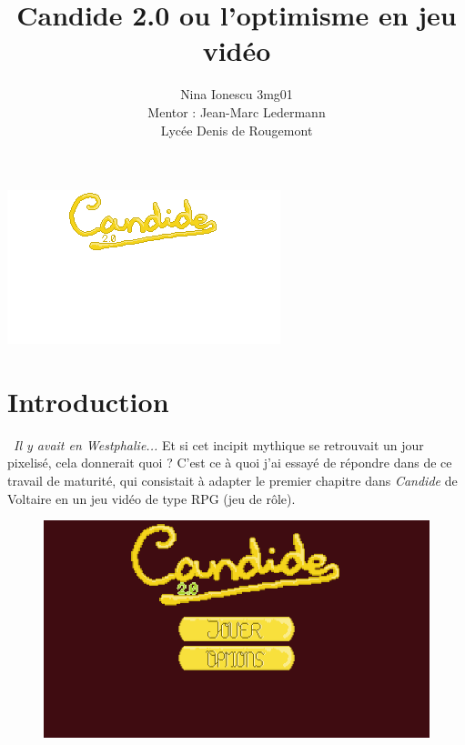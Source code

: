\documentclass[11pt]{article}
\begin{document}
\renewcommand{\appendixtocname}{Annexes}
\renewcommand{\appendixpagename}{Annexes}
\renewcommand{\refname}{Sources}



\title{Candide 2.0 ou l'optimisme en jeu vidéo }
\author{Nina Ionescu 3mg01 \\ Mentor : Jean-Marc Ledermann \\ Lycée Denis de Rougemont}
\date{}
\maketitle
\includegraphics{title}
\newpage
\tableofcontents
\newpage
{}
\section{Introduction}\
\textit {Il y avait en Westphalie...} Et si cet incipit mythique se retrouvait un jour pixelisé, cela donnerait quoi ? C'est ce à quoi j'ai essayé de répondre dans de ce travail de maturité, qui consistait à adapter le premier chapitre dans \textit{Candide} de Voltaire en un jeu vidéo de type RPG (jeu de rôle).
\begin{figure}[h]
\includegraphics[scale=0.33]{ecranTitre}
\centering
\end{figure}
\end{document}
